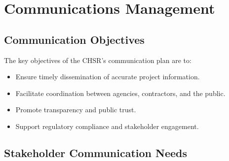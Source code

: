 \chapter{Communications Management}
\section{Communication Objectives}
\parindent20pt The key objectives of the CHSR’s communication plan are to: \begin{itemize}
	\item Ensure timely dissemination of accurate project information.
	\item Facilitate coordination between agencies, contractors, and the public.
	\item Promote transparency and public trust.
	\item Support regulatory compliance and stakeholder engagement.
\end{itemize}

\section{Stakeholder Communication Needs} \vspace*{0.7em}
 \raggedright
\setlength{\extrarowheight}{5pt} %

